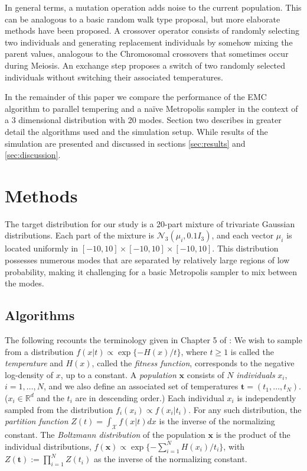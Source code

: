 \documentclass[12pt]{article}\usepackage[]{graphicx}\usepackage[]{color}
\newcommand{\bx}{\mathbf x}
\newcommand{\bt}{\mathbf t}
\newcommand{\X}{\mathcal X}
\begin{document}
In general terms, a mutation operation adds noise to the current
population. This can be analogous to a basic random walk type
proposal, but more elaborate methods have been proposed. A crossover
operator consists of randomly selecting two individuals and generating
replacement individuals by somehow mixing the parent values, analogous
to the Chromosomal crossovers that sometimes occur during Meiosis.  An
exchange step proposes a switch of two randomly selected individuals
without switching their associated temperatures.


In the remainder of this paper we compare the performance of the EMC
algorithm to parallel tempering and a na\"ive Metropolis sampler in
the context of a 3 dimensional distribution with 20 modes.  Section
two describes in greater detail the algorithms used and the simulation
setup.  While results of the simulation are presented and discussed in
sections \ref{sec:results} and \ref{sec:discussion}.

\setcounter{section}{1}
\section{Methods}
\label{sec:methods}
The target distribution for our study is a 20-part mixture of
trivariate Gaussian distributions. Each part of the mixture is
$\mathcal{N}_3(\mu_i, 0.1I_3)$, and each vector $\mu_i$ is located
uniformly in $[-10,10]\times[-10,10]\times[-10,10].$ This distribution
possesses numerous modes that are separated by relatively large
regions of low probability, making it challenging for a basic
Metropolis sampler to mix between the modes.

\subsection{Algorithms}
\label{sec:algorithms}
The following recounts the terminology given in Chapter 5 of
\cite{Liang:2011}: We wish to sample from a distribution $f(x|t)
\propto \exp\{ -H(x)/t \}$, where $t\ge 1$ is called the
\emph{temperature} and $H(x)$, called the \emph{fitness function},
corresponds to the negative log-density of $x$, up to a constant. A
\emph{population} $\mathbf{x}$ consists of $N$ \emph{individuals}
$x_i$, $i = 1, \ldots, N$, and we also define an associated set of
temperatures $\bt = (t_1,\ldots,t_N)$. ($x_i \in \mathbb{R}^d$ and the
$t_i$ are in descending order.) Each individual $x_i$ is independently
sampled from the distribution $f_i(x_i) \propto f(x_i|t_i)$.  For any
such distribution, the \emph{partition function} $Z(t)= \int_\X f(x|t)
dx$ is the inverse of the normalizing constant. The \emph{Boltzmann
  distribution} of the population $\bx$ is the product of the
individual distributions, $f(\bx) \propto \exp \{ -\sum_{i=1}^N
H(x_i)/ t_i \}$, with $Z(\bt) := \prod_{i=1}^N Z(t_i)$ as the inverse
of the normalizing constant.
\end{document}
